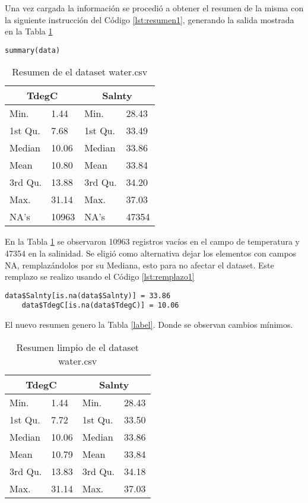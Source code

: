 \documentclass[sigconf]{acmart}
\begin{document}
Una vez cargada la información se procedió a obtener el resumen de la misma con la siguiente instrucción del Código \ref{lst:resumen1}, generando la salida mostrada en la Tabla \ref{tab:Tabla1}

\begin{lstlisting}[caption=Resumen de los datos,breaklines,label=lst:resumen1]
summary(data)
\end{lstlisting}

\begin{table}
	\begin{tabularx}{\columnwidth}{|X|X|X|X|}
		\hline
		\multicolumn{2}{|c|}{ TdegC } & \multicolumn{2}{|c|}{ Salnty }  \\
		\hline
		Min. & 1.44  & Min. & 28.43 \\
		\hline
		1st Qu.& 7.68 &1st Qu.&33.49 \\
		\hline
		Median &10.06  & Median & 33.86   \\
		\hline
		Mean & 10.80 & Mean & 33.84\\
		\hline
		3rd Qu.&13.88 & 3rd Qu. & 34.20\\
		\hline
		Max. & 31.14 & Max.& 37.03  \\
		\hline
		NA's & 10963 & NA's  & 47354\\
		\hline
	\end{tabularx}
	\caption{\label{tab:Tabla1}Resumen de el dataset water.csv}
\end{table}

En la Tabla \ref{tab:Tabla1} se observaron 10963 registros vacíos en el campo de temperatura y 47354 en la salinidad.
Se eligió como alternativa dejar los elementos con campos NA, remplazándolos por su Mediana, esto para no afectar el dataset. Este remplazo se realizo usando el Código \ref{lst:remplazo1}

\begin{lstlisting}[caption=Código de emplazo de los NA,breaklines,label=lst:remplazo1]
	data$Salnty[is.na(data$Salnty)] = 33.86
	data$TdegC[is.na(data$TdegC)] = 10.06
\end{lstlisting}

El nuevo resumen genero la Tabla \ref{label}. Donde se observan cambios mínimos.

\begin{table}
	\begin{tabularx}{\columnwidth}{|X|X|X|X|}
		\hline
		\multicolumn{2}{|c|}{ TdegC } & \multicolumn{2}{|c|}{ Salnty }  \\
		\hline
		Min. & 1.44  & Min. & 28.43 \\
		\hline
		1st Qu.& 7.72 &1st Qu.&33.50 \\
		\hline
		Median &10.06  & Median & 33.86   \\
		\hline
		Mean & 10.79 & Mean & 33.84\\
		\hline
		3rd Qu.&13.83 & 3rd Qu. & 34.18\\
		\hline
		Max. & 31.14 & Max.& 37.03  \\
		\hline
	\end{tabularx}
	\caption{\label{tab:Tabla2}Resumen limpio de el dataset water.csv}
\end{table}
\end{document}
